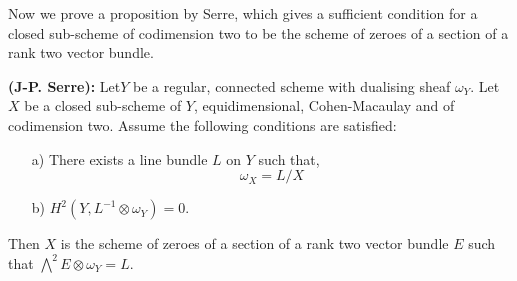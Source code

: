 Now we prove a proposition by Serre, which gives a sufficient
condition for a closed sub-scheme of codimension two to be the scheme
of zeroes of a section of a rank two vector bundle.
\begin{Prop*}
{\bf (J-P. Serre):} Let\pageoriginale $Y$ be a regular, connected
scheme with dualising sheaf $\omega_Y$. Let $X$ be a closed sub-scheme
of $Y$, equidimensional, Cohen-Macaulay and of codimension two. Assume
the following conditions are satisfied:
\begin{itemize}
\item [a)] There exists a line bundle $L$ on $Y$ such that,
$$
\omega_X=L/X
$$
\item [b)] $H^2(Y,L^{-1}\otimes\omega_Y)=0$.
\end{itemize}

Then $X$ is the scheme of zeroes of a section of a rank two vector
bundle $E$ such that $\bigwedge\limits^2E\otimes\omega_Y=L$. 
\end{Prop*}

